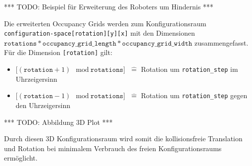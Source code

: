*** TODO: Beispiel für Erweiterung des Roboters um Hindernis ***

Die erweiterten Occupancy Grids werden zum Konfigurationsraum \texttt{configuration-space[rotation][y][x]} mit den Dimensionen $\texttt{rotations} * \texttt{occupancy\_grid\_length} * \texttt{occupancy\_grid\_width}$ zusammengefasst. Für die Dimension \texttt{[rotation]} gilt:
\begin{itemize}
\item $\text{[}(\texttt{rotation} + 1) \mod \texttt{rotations]}$ $\widehat{=}$ Rotation um \texttt{rotation\_step} im Uhrzeigersinn
\item $\text{[}(\texttt{rotation} - 1) \mod \texttt{rotations]}$ $\widehat{=}$ Rotation um \texttt{rotation\_step} gegen den Uhrzeigersinn
\end{itemize}


*** TODO: Abbildung 3D Plot ***

Durch diesen 3D Konfigurationsraum wird somit die kollisionsfreie Translation und Rotation bei minimalem Verbrauch des freien Konfigurationsraums ermöglicht.
